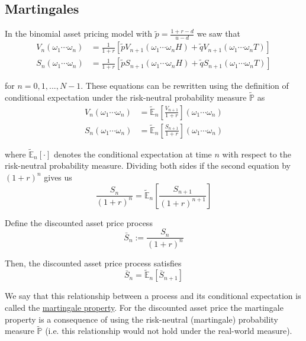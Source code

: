\documentclass[12pt]{article}
\newlength\tindent
\renewcommand{\indent}{\hspace*{\tindent}}
\renewcommand{\P}{\mathbb P}
\newcommand{\E}{\mathbb E}
\begin{document}
\subsection{Martingales}

In the binomial asset pricing model with $\tilde{p} = \frac{1 + r - d}{u - d}$ we saw that
\begin{align*}
	V_n(\omega_1\cdots\omega_n) &= \frac{1}{1 + r}[\tilde{p}V_{n + 1}(\omega_1\cdots\omega_n H) + \tilde{q}V_{n + 1}(\omega_1\cdots\omega_n T)] \\
	S_n(\omega_1\cdots\omega_n) &= \frac{1}{1 + r}[\tilde{p}S_{n + 1}(\omega_1\cdots\omega_n H) + \tilde{q}S_{n + 1}(\omega_1\cdots\omega_n T)]
\end{align*}

for $n = 0, 1, ..., N - 1$. These equations can be rewritten using the definition of conditional expectation under the risk-neutral probability measure $\tilde{\P}$ as
\begin{align*}
	V_n(\omega_1\cdots\omega_n) &= \tilde{\E}_n\left[ \frac{V_{n + 1}}{1 + r} \right](\omega_1\cdots\omega_n) \\
	S_n(\omega_1\cdots\omega_n) &= \tilde{\E}_n\left[ \frac{S_{n + 1}}{1 + r} \right](\omega_1\cdots\omega_n)
\end{align*}

where $\tilde{\E}_n[\cdot]$ denotes the conditional expectation at time $n$ with respect to the risk-neutral probability measure. Dividing both sides if the second equation by $(1 + r)^n$ gives us
\begin{equation*}
	\frac{S_n}{(1 + r)^n} = \tilde{\E}_n\left[ \frac{S_{n + 1}}{(1 + r)^{n + 1}} \right]
\end{equation*}

Define the discounted asset price process
\begin{equation*}
	\bar{S}_n := \frac{S_n}{(1 + r)^n}
\end{equation*}

Then, the discounted asset price process satisfies
\begin{equation*}
	\bar{S}_n = \tilde{\E}_n[\bar{S}_{n + 1}]
\end{equation*}

\indent We say that this relationship between a process and its conditional expectation is called the \underline{martingale property}. For the discounted asset price the martingale property is a consequence of using the risk-neutral (martingale) probability measure $\tilde{\P}$ (i.e. this relationship would not hold under the real-world measure). \\
\end{document}
